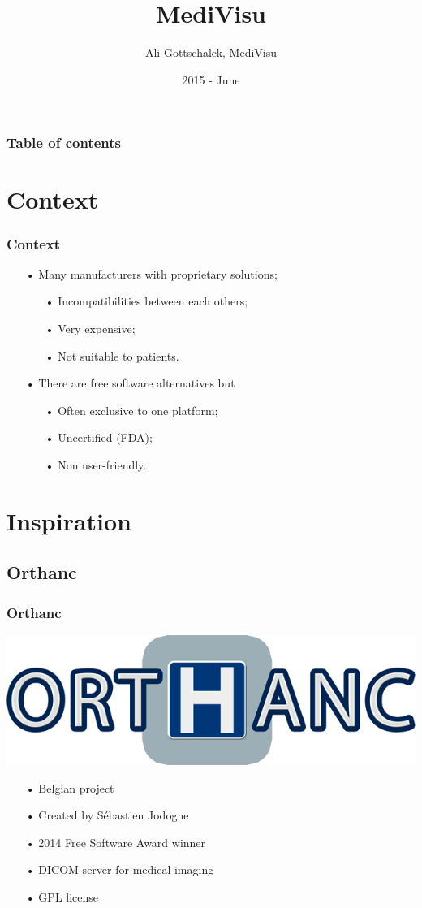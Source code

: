 \documentclass[11pt]{beamer}
\author{Ali Gottschalck, MediVisu}
\title{MediVisu}
\institute{HEB - ESI}
\date{2015 - June}
\begin{document}
\begin{frame}
\titlepage
\end{frame}

\begin{frame}
\frametitle{Table of contents}
\tableofcontents
\end{frame}

\section{Context}

\begin{frame}
\frametitle{Context}
\begin{itemize}[<+->]
\item[•] Many manufacturers with proprietary solutions;
\begin{itemize}[<+->]
\item[•] Incompatibilities between each others;
\item[•] Very expensive;
\item[•] Not suitable to patients.
\end{itemize}
\item[•] There are free software alternatives but
\begin{itemize}[<+->]
\item[•] Often exclusive to one platform;
\item[•] Uncertified (FDA);
\item[•] Non user-friendly.
\end{itemize}
\end{itemize}
\end{frame}

\section{Inspiration}

\subsection{Orthanc}

\begin{frame}
\frametitle{Orthanc}
\includegraphics[scale=0.15]{Orthanc.png}
\begin{itemize}[<+->]
\item[•] Belgian project
\item[•] Created by Sébastien Jodogne
\item[•] 2014 Free Software Award winner
\item[•] DICOM server for medical imaging
\item[•] GPL license
\end{itemize}
\end{frame}
\end{document}
